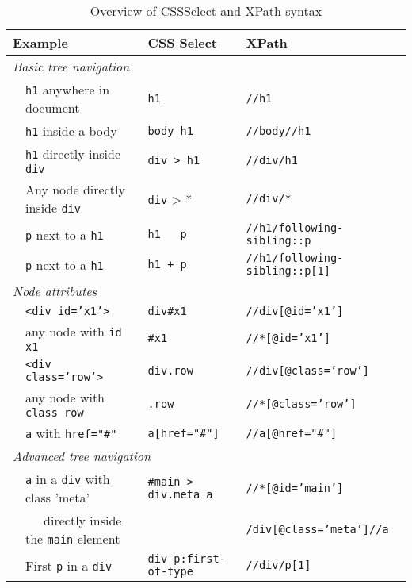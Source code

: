 \begin{table}
  \caption{\label{tab:cssselect}Overview of CSSSelect and XPath syntax}{
  \begin{tabularx}{\textwidth}{llll}
\toprule
\multicolumn{2}{l}{Example}      & CSS Select   & XPath    \\
\midrule
\multicolumn{3}{l}{\textit{Basic tree navigation}} \\
& \texttt{\small{h1}} anywhere in document & \texttt{\small{h1}} & \texttt{\small{//h1}} \\
& \texttt{\small{h1}} inside a body & \texttt{\small{body h1}} & \texttt{\small{//body//h1}} \\
& \texttt{\small{h1}} directly inside \texttt{\small{div}} & \texttt{\small{div > h1}} & \texttt{\small{//div/h1}} \\
& Any node directly inside \texttt{\small{div}} & \texttt{\small{div}} > * & \texttt{\small{//div/*}} \\
& \texttt{\small{p}} next to a \texttt{\small{h1}} & \texttt{\small{h1 ~ p}} & \texttt{\small{//h1/following-sibling::p}} \\
& \texttt{\small{p}} next to a \texttt{\small{h1}} & \texttt{\small{h1 + p}} & \texttt{\small{//h1/following-sibling::p[1]}} \\
\multicolumn{3}{l}{\textit{Node attributes}} \\
& \texttt{\small{<div id='x1'>}} & \texttt{\small{div\#x1}} & \texttt{\small{//div[@id='x1']}} \\
& any node with \texttt{\small{id x1}} & \texttt{\small{\#x1}} & \texttt{\small{//*[@id='x1']}} \\
& \texttt{\small{<div class='row'>}} & \texttt{\small{div.row}} & \texttt{\small{//div[@class='row']}} \\
& any node with \texttt{\small{class row}} & \texttt{\small{.row}} & \texttt{\small{//*[@class='row']}} \\
& \texttt{\small{a}} with \texttt{\small{href="\#"}} & \texttt{\small{a[href="\#"]}} & \texttt{\small{//a[@href="\#"]}} \\
\multicolumn{3}{l}{\textit{Advanced tree navigation}} \\
& \texttt{\small{a}} in a \texttt{\small{div}} with class 'meta' & \texttt{\small{\#main > div.meta a}} & \texttt{\small{//*[@id='main']}} \\
& $\;\;\;\;$ directly inside the \texttt{\small{main}} element & &$\;\;\;\;$ \texttt{\small{/div[@class='meta']//a}} \\
& First \texttt{\small{p}} in a \texttt{\small{div}} & \texttt{\small{div p:first-of-type}} & \texttt{\small{//div/p[1]}} \\

\end{tabularx}}
\end{table}

